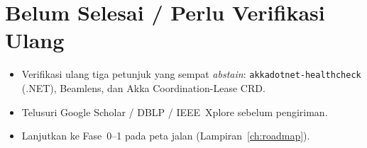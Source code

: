 \section{Belum Selesai / Perlu Verifikasi Ulang}
\begin{itemize}[leftmargin=2.2em,nosep]
  \item[\cbtodo] Verifikasi ulang tiga petunjuk yang sempat \emph{abstain}:
        \texttt{akkadotnet-healthcheck} (.NET), Beamlens, dan Akka Coordination-Lease CRD.
  \item[\cbtodo] Telusuri Google Scholar / DBLP / IEEE~Xplore sebelum pengiriman.
  \item[\cbtodo] Lanjutkan ke Fase~0--1 pada peta jalan (Lampiran~\ref{ch:roadmap}).
\end{itemize}
